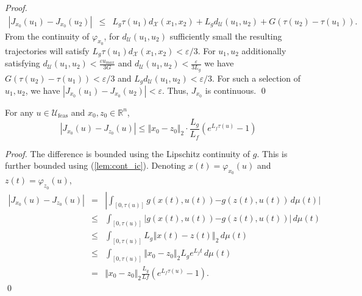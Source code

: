 \documentclass{llncs}
\begin{document}
\begin{proof}
\begin{equation}
\begin{array}{rcl}
\left|J_{x_0}(u_{1})-J_{x_0}(u_{2})\right| & \leq & L_{g}\tau(u_{1}) d_{\mathcal{X}}(x_1,x_2) + L_{g}d_{\mathcal{U}}(u_1,u_2) +G(\tau(u_2)-\tau(u_1)). 
\end{array}
\label{eq:cost_diff2}
\end{equation}
From the continuity of $\varphi_{x_0}$, for $d_{\mathcal{U}}(u_1,u_2)$ sufficiently small the resulting trajectories will satisfy $L_{g}\tau(u_{1}) d_{\mathcal{X}}(x_1,x_2)<\varepsilon/3$. For $u_1,u_2$ additionally satisfying $d_{\mathcal{U}}(u_1,u_2)<\frac{\varepsilon u_{max}}{3G}$ and $d_{\mathcal{U}}(u_1,u_2)<\frac{\varepsilon}{3L_g}$ we have $G(\tau(u_2)-\tau(u_1))<\varepsilon/3$  and $L_{g}d_{\mathcal{U}}(u_1,u_2)<\varepsilon/3$. For such a selection of $u_1,u_2$, we have $|J_{x_0}(u_1)-J_{x_0}(u_2)|<\varepsilon$. Thus, $J_{x_0}$ is continuous.
\qed
\end{proof} 
\begin{lemma}
\label{lem:cost_sensitivity}For any $u\in\mathcal{U}_\mathrm{feas}$ and
$x_{0},z_{0}\in\mathbb{R}^{n}$, 
\begin{equation}
|J_{x_{0}}(u)-J_{z_{0}}(u)|\leq\Vert x_{0}-z_{0}\Vert_{2}\cdot\frac{L_{g}}{L_{f}}\left(e^{L_{f}\tau(u)}-1\right)\label{eq:cost_sensitivity}
\end{equation}
\end{lemma}
\begin{proof}
The difference is bounded using the Lipschitz continuity of $g$. This is further bounded using (\ref{lem:cont_ic}). Denoting $x(t)=\varphi_{x_{0}}(u)$ and $z(t)=\varphi_{z_{0}}(u)$,
\begin{equation}
\begin{array}{rcl}
|J_{x_{0}}(u)-J_{z_{0}}(u)| & = & \left|\int_{[0,\tau(u)]}g(x(t),u(t))\right. \left.-g(z(t),u(t))\, d\mu(t) \right|\\
 & \leq & \int_{[0,\tau(u)]}\left|g(x(t),u(t))\right. \left.-g(z(t),u(t))\right|\, d\mu(t)\\
 & \leq & \int_{[0,\tau(u)]}L_{g}\left\Vert x(t)-z(t)\right\Vert _{2}\, d\mu(t)\\
 & \leq & \int_{[0,\tau(u)]}\Vert x_{0}-z_{0}\Vert_{2} L_{g}e^{L_{f}t}\, d\mu(t)\\
 & = & \Vert x_{0}-z_{0}\Vert_{2}\frac{L_{g}}{Lf}\left(e^{L_{f}\tau(u)}-1\right).
\end{array}
\end{equation}
 \qed
\end{proof}
\end{document}
